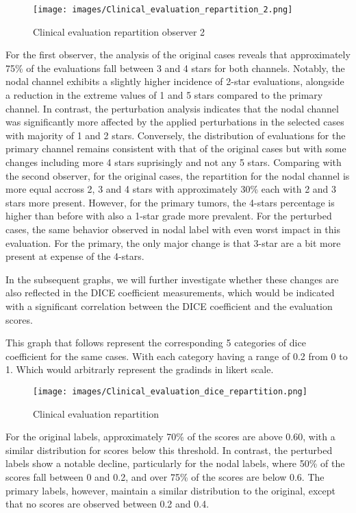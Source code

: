 \begin{figure}[ht]
    \centering
    \texttt{[image: images/Clinical\_evaluation\_repartition\_2.png]}
    \caption{Clinical evaluation repartition observer 2}
    \label{fig:three_subfigures}
\end{figure}

\newpage

For the first observer, the analysis of the original cases reveals that approximately 75\% of the evaluations fall between 3 and 4 stars for both channels. Notably, the nodal channel exhibits a slightly higher incidence of 2-star evaluations, alongside a reduction in the extreme values of 1 and 5 stars compared to the primary channel.
In contrast, the perturbation analysis indicates that the nodal channel was significantly more affected by the applied perturbations in the selected cases with majority of 1 and 2 stars. Conversely, the distribution of evaluations for the primary channel remains consistent with that of the original cases but with some changes including more 4 stars suprisingly and not any 5 stars.
Comparing with the second observer, for the original cases, the repartition for the nodal channel is more equal accross 2, 3 and 4 stars with approximately 30\% each with 2 and 3 stars more present.
However, for the primary tumors, the 4-stars percentage is higher than before with also a 1-star grade more prevalent. 
For the perturbed cases, the same behavior observed in nodal label with even worst impact in this evaluation. For the primary, the only major change is that 3-star are a bit more present at expense of the 4-stars.

In the subsequent graphs, we will further investigate whether these changes are also reflected in the DICE coefficient measurements, which would be indicated with a significant correlation between the DICE coefficient and the evaluation scores.

This graph that follows represent the corresponding 5 categories of dice coefficient for the same cases. With each category having a range of 0.2 from 0 to 1.
Which would arbitrarly represent the gradinds in likert scale.
\begin{figure}[ht]
    \centering
    \texttt{[image: images/Clinical\_evaluation\_dice\_repartition.png]}
    \caption{Clinical evaluation repartition}
    \label{fig:three_subfigures}
\end{figure}

For the original labels, approximately 70\% of the scores are above 0.60, with a similar distribution for scores below this threshold. In contrast, the perturbed labels show a notable decline, particularly for the nodal labels, where 50\% of the scores fall between 0 and 0.2, and over 75\% of the scores are below 0.6. The primary labels, however, maintain a similar distribution to the original, except that no scores are observed between 0.2 and 0.4.

